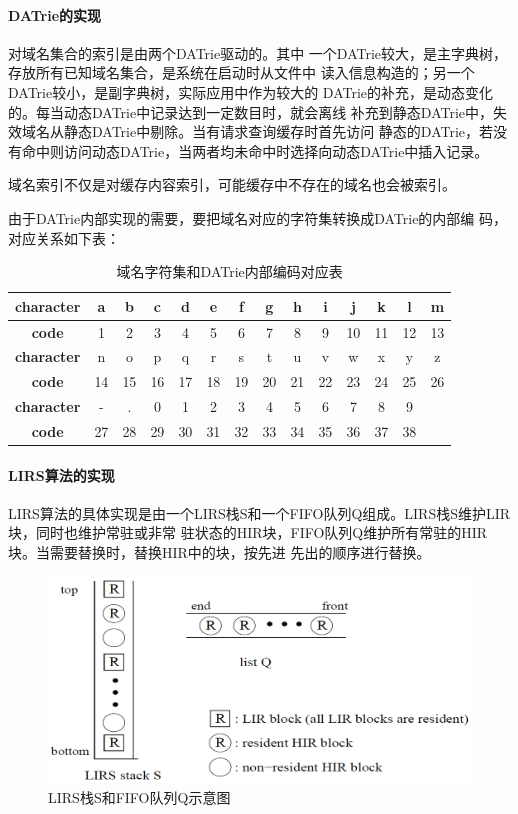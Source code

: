 \paragraph{DATrie的实现\\[5pt]}
	对域名集合的索引是由两个DATrie驱动的。其中
	一个DATrie较大，是主字典树，存放所有已知域名集合，是系统在启动时从文件中
	读入信息构造的；另一个DATrie较小，是副字典树，实际应用中作为较大的
	DATrie的补充，是动态变化的。每当动态DATrie中记录达到一定数目时，就会离线
	补充到静态DATrie中，失效域名从静态DATrie中剔除。当有请求查询缓存时首先访问
	静态的DATrie，若没有命中则访问动态DATrie，当两者均未命中时选择向动态DATrie中插入记录。
	\par
	 {域名索引不仅是对缓存内容索引，可能缓存中不存在的域名也会被索引。 }
	 \par{由于DATrie内部实现的需要，要把域名对应的字符集转换成DATrie的内部编
	 码，对应关系如下表：}

\begin{table}[H]
\centering
\begin{tabular}{*{14}{|c}|}
\hline
\textbf{character}&a&b&c&d&e&f&g&h&i&j&k&l&m\\
\hline
\textbf{code}&1&2&3&4&5&6&7&8&9&10&11&12&13\\
\hline
\textbf{character}&n&o&p&q&r&s&t&u&v&w&x&y&z\\
\hline
\textbf{code}&14&15&16&17&18&19&20&21&22&23&24&25&26\\
\hline
\textbf{character}&-&.&0&1&2&3&4&5&6&7&8&9\\
\textbf{code}&27&28&29&30&31&32&33&34&35&36&37&38\\
\end{tabular}
\caption{域名字符集和DATrie内部编码对应表}
\end{table}


\paragraph{LIRS算法的实现\\[5pt]}
LIRS算法的具体实现是由一个LIRS栈S和一个FIFO队列Q组成。LIRS栈S维护LIR块，同时也维护常驻或非常
驻状态的HIR块，FIFO队列Q维护所有常驻的HIR块。当需要替换时，替换HIR中的块，按先进
先出的顺序进行替换。
\begin{figure}[H]
\centering
\includegraphics[keepaspectratio, scale=0.4]{pitures/lirsstack.png}
\caption{LIRS栈S和FIFO队列Q示意图} 
\end{figure}


